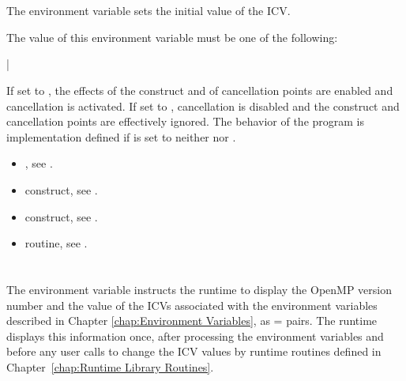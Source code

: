 \section{}
\label{sec:OMP_CANCELLATION}
The  environment variable sets the initial value 
of the  ICV.

The value of this environment variable must be one of the following:

{|}

If set to , the
effects of the  construct and of cancellation points are 
enabled and cancellation is activated. If set to , cancellation 
is disabled and the  construct and cancellation points are 
effectively ignored. The behavior of the program is implementation defined 
if  is set to neither  nor .

\crossreferences
\begin{itemize}
\item {}, see .

\item {} construct, see .

\item {} construct, 
see .

\item {} routine, 
see .
\end{itemize}



\section{}
\label{sec:OMP_DISPLAY_ENV}
The  environment variable instructs the runtime to 
display the OpenMP version number and the value of the ICVs associated with 
the environment variables described in Chapter \ref{chap:Environment Variables},
as  =  pairs. The runtime displays this information 
once, after processing the environment variables and before any user calls
to change the ICV values by runtime routines defined in 
Chapter~\ref{chap:Runtime Library Routines}.

